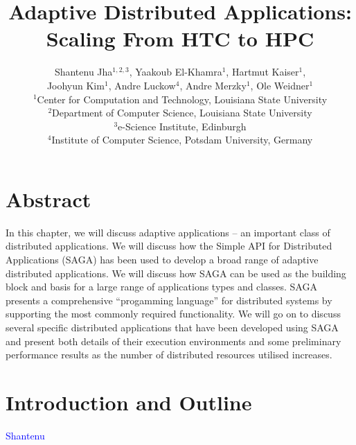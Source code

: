 \documentclass[10pt,letterpaper]{article}
\begin{document}
\title{Adaptive Distributed Applications: Scaling From HTC to HPC} 

\author{Shantenu Jha$^{1,2,3}$, Yaakoub El-Khamra$^{1}$,  Hartmut Kaiser$^{1}$, \\
  Joohyun Kim$^{1}$, Andre Luckow$^{4}$, Andre Merzky$^{1}$,  Ole Weidner$^{1}$ \\[1em]
  \small $^1$Center for Computation and Technology,
  Louisiana State University\\[-0.3em]
  \small $^2$Department of Computer Science,
  Louisiana State University\\[-0.3em]
  \small $^3$e-Science Institute, Edinburgh\\[-0.3em]
  \small $^{4}$Institute of Computer Science, Potsdam University, Germany\\
}

\maketitle

\vspace*{5mm}

\section*{Abstract}

In this chapter, we will discuss adaptive applications -- an important
class of distributed applications. We will discuss how the Simple API
for Distributed Applications (SAGA) has been used to develop a broad
range of adaptive distributed applications. We will discuss how SAGA
can be used as the building block and basis for a large range of
applications types and classes. SAGA presents a comprehensive
``progamming language'' for distributed systems by supporting the most
commonly required functionality.  We will go on to discuss several
specific distributed applications that have been developed using SAGA
and present both details of their execution environments and some
preliminary performance results as the number of distributed resources
utilised increases.


\newpage

\section{Introduction and Outline}
\textcolor{blue}{Shantenu} \hspace{0.1in} \textcolor{blue}{}
\hspace{0.1in} \textcolor{blue}{}
\end{document}
